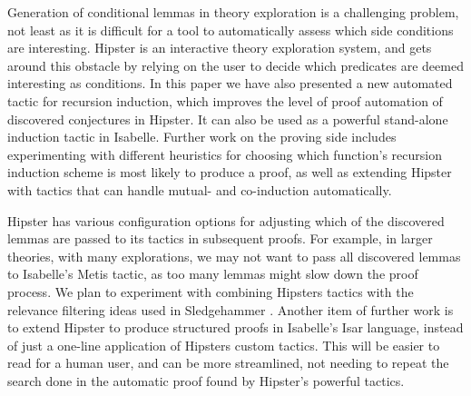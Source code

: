 \label{sec:conclusion}

Generation of conditional lemmas in theory exploration is a challenging problem, not least as it is difficult for a tool to automatically assess which side conditions are interesting. Hipster is an interactive theory exploration system, and gets around this obstacle by relying on the user to decide which predicates are deemed interesting as conditions. In this paper we have also presented a new automated tactic for recursion induction, which improves the level of proof automation of discovered conjectures in Hipster. It can also be used as a powerful stand-alone induction tactic in Isabelle. 
Further work on the proving side includes experimenting with different heuristics for choosing which function's recursion induction scheme is most likely to produce a proof, as well as extending Hipster with tactics that can handle mutual- and co-induction automatically.

Hipster has various configuration options for adjusting which of the discovered lemmas are passed to its tactics in subsequent proofs. For example, in larger theories, with many explorations, we may not want to pass all discovered lemmas to Isabelle's Metis tactic, as too many lemmas might slow down the proof process. We plan to experiment with combining Hipsters tactics with the relevance filtering ideas used in Sledgehammer \cite{mash}. Another item of further work is to extend Hipster to produce structured proofs in Isabelle's Isar language, instead of just a one-line application of Hipsters custom tactics. This will be easier to read for a human user, and can be more streamlined, not needing to repeat the search done in the automatic proof found by Hipster's powerful tactics. 

